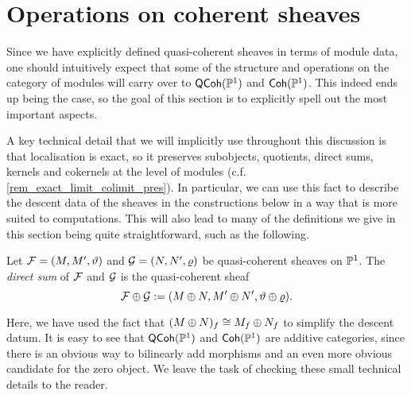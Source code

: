 \section{Operations on coherent sheaves}

Since we have explicitly defined quasi-coherent sheaves in terms of
module data, one should intuitively expect that some of the structure
and operations on the category of modules will carry over to
$\operatorname{\mathsf{QCoh}}(\mathbb{P}^{{1}})$ and $\operatorname{\mathsf{Coh}}(\mathbb{P}^{{1}})$.
This indeed ends up being the case, so the goal of this section is to
explicitly spell out the most important aspects.

A key technical detail that we will implicitly use throughout this
discussion is that localisation is exact, so it preserves subobjects,
quotients, direct sums, kernels and cokernels at the level of modules
(c.f. \cref{rem_exact_limit_colimit_pres}).
In particular, we can use this fact to describe the descent data of
the sheaves in the constructions below in a way that is more suited
to computations.
This will also lead to many of the definitions we give in this
section being quite straightforward, such as the following.

\begin{definition}
  Let $\mathcal{F} = (M, M', \vartheta)$ and $\mathcal{G} = (N, N', \varrho)$
  be quasi-coherent sheaves on $\mathbb{P}^{{1}}$.
  The \emph{direct sum} of $\mathcal{F}$ and $\mathcal{G}$ is the quasi-coherent sheaf
  \[
    \mathcal{F} \oplus \mathcal{G} := (M \oplus N, M' \oplus N', \vartheta
    \oplus \varrho).
  \]
  \vspace{-24pt}
\end{definition}

Here, we have used the fact that $(M \oplus N)_f \cong M_f \oplus
N_f$ to simplify the descent datum.
It is easy to see that $\operatorname{\mathsf{QCoh}}(\mathbb{P}^{{1}})$ and $\operatorname{\mathsf{Coh}}(\mathbb{P}^{{1}})$ are
additive categories, since there is an obvious way to bilinearly add
morphisms and an even more obvious candidate for the zero object.
We leave the task of checking these small technical details to the reader.

